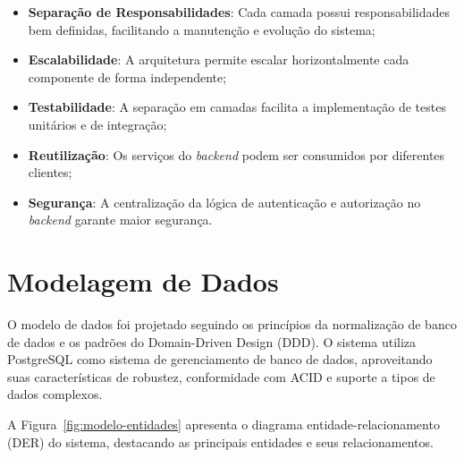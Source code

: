 \begin{itemize}
    \item \textbf{Separação de Responsabilidades}: Cada camada possui responsabilidades bem definidas, facilitando a manutenção e evolução do sistema;
    \item \textbf{Escalabilidade}: A arquitetura permite escalar horizontalmente cada componente de forma independente;
    \item \textbf{Testabilidade}: A separação em camadas facilita a implementação de testes unitários e de integração;
    \item \textbf{Reutilização}: Os serviços do \textit{backend} podem ser consumidos por diferentes clientes;
    \item \textbf{Segurança}: A centralização da lógica de autenticação e autorização no \textit{backend} garante maior segurança.
\end{itemize}

\section{Modelagem de Dados}

O modelo de dados foi projetado seguindo os princípios da normalização de banco de dados e os padrões do Domain-Driven Design (DDD). O sistema utiliza PostgreSQL como sistema de gerenciamento de banco de dados, aproveitando suas características de robustez, conformidade com ACID e suporte a tipos de dados complexos.

A Figura~\ref{fig:modelo-entidades} apresenta o diagrama entidade-relacionamento (DER) do sistema, destacando as principais entidades e seus relacionamentos.

